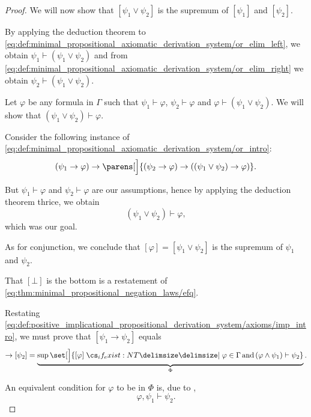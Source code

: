 \begin{proof}
   We will now show that \( [\psi_1 \vee \psi_2] \) is the supremum of \( [\psi_1] \) and \( [\psi_2] \).

  By applying the deduction theorem to \eqref{eq:def:minimal_propositional_axiomatic_derivation_system/or_elim_left}, we obtain \( \psi_1 \vdash (\psi_1 \vee \psi_2) \) and from \eqref{eq:def:minimal_propositional_axiomatic_derivation_system/or_elim_right} we obtain \( \psi_2 \vdash (\psi_1 \vee \psi_2) \).

  Let \( \varphi \) be any formula in \( \Gamma \) such that \( \psi_1 \vdash \varphi \), \( \psi_2 \vdash \varphi \) and \( \varphi \vdash (\psi_1 \vee \psi_2) \). We will show that \( (\psi_1 \vee \psi_2) \vdash \varphi \).

  Consider the following instance of \eqref{eq:def:minimal_propositional_axiomatic_derivation_system/or_intro}:
  \begin{equation*}
    (\psi_1 \rightarrow \varphi) \rightarrow \parens[\Big]{ (\psi_2 \rightarrow \varphi) \rightarrow ((\psi_1 \vee \psi_2) \rightarrow \varphi) }.
  \end{equation*}

  But \( \psi_1 \vdash \varphi \) and \( \psi_2 \vdash \varphi \) are our assumptions, hence by applying the deduction theorem thrice, we obtain
  \begin{equation*}
    (\psi_1 \vee \psi_2) \vdash \varphi,
  \end{equation*}
  which was our goal.

  As for conjunction, we conclude that \( [\varphi] = [\psi_1 \vee \psi_2] \) is the supremum of \( \psi_1 \) and \( \psi_2 \).

  That \( [\bot] \) is the bottom is a restatement of \eqref{eq:thm:minimal_propositional_negation_laws/efq}.

   Restating \eqref{eq:def:positive_implicational_propositional_derivation_system/axioms/imp_intro}, we must prove that \( [\psi_1 \rightarrow \psi_2] \) equals
  \begin{equation*}
    [\psi_1] \rightarrow [\psi_2] = \underbrace{\sup\set[\Big]{ [\varphi] \given* \varphi \in \Gamma \T{and} (\varphi \wedge \psi_1) \vdash \psi_2 }}_{\Phi}.
  \end{equation*}

  An equivalent condition for \( \varphi \) to be in \( \Phi \) is, due to ,
  \begin{equation*}
    \varphi, \psi_1 \vdash \psi_2.
  \end{equation*}


\end{proof}
